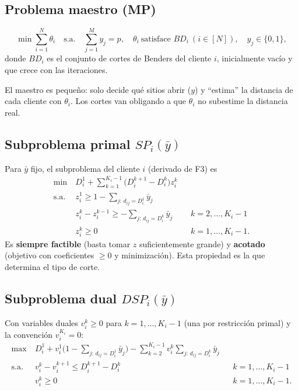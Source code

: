 \subsection{Problema maestro (MP)}
\begin{equation}
  \min \sum_{i=1}^N \theta_i
  \quad\text{s.a.}\quad
  \sum_{j=1}^M y_j=p,\quad
  \theta_i\ \text{satisface } BD_i\ (i\in[N]),\quad
  y_j\in\{0,1\},
  \label{eq:master}
\end{equation}
donde $BD_i$ es el conjunto de cortes de Benders del cliente $i$, inicialmente vacío y que crece
con las iteraciones.

\begin{intuicion}
El maestro es pequeño: solo decide qué sitios abrir ($y$) y ``estima'' la distancia de cada
cliente con $\theta_i$. Los cortes van obligando a que $\theta_i$ no subestime la distancia real.
\end{intuicion}

\subsection{Subproblema primal \texorpdfstring{$SP_i(\bar y)$}{SPi}}
Para $\bar y$ fijo, el subproblema del cliente $i$ (derivado de F3) es
\begin{align}
  \min\ & D^1_i + \sum_{k=1}^{K_i-1}\big(D^{k+1}_i-D^k_i\big)z^k_i \nonumber\\
  \text{s.a.}\ & z^1_i \ge 1-\!\!\sum_{j:\,d_{ij}=D^1_i}\!\!\bar y_j \label{eq:sp1}\\
  & z^k_i - z^{k-1}_i \ge -\!\!\sum_{j:\,d_{ij}=D^k_i}\!\!\bar y_j && k=2,\dots,K_i-1 \label{eq:spk}\\
  & z^k_i\ge 0 && k=1,\dots,K_i-1. \nonumber
\end{align}
Es \textbf{siempre factible} (basta tomar $z$ suficientemente grande) y \textbf{acotado} (objetivo
con coeficientes $\ge 0$ y minimización). Esta propiedad es la que determina el tipo de corte.

\subsection{Subproblema dual \texorpdfstring{$DSP_i(\bar y)$}{DSPi}}
Con variables duales $v^k_i\ge0$ para $k=1,\dots,K_i-1$ (una por restricción primal) y la
convención $v_i^{K_i}=0$:
\begin{align}
  \max\ & D^1_i + v^1_i\Big(1-\!\!\sum_{j:\,d_{ij}=D^1_i}\!\!\bar y_j\Big) - \sum_{k=2}^{K_i-1} v^k_i\!\!\sum_{j:\,d_{ij}=D^k_i}\!\!\bar y_j \nonumber\\
  \text{s.a.}\ & v^k_i - v^{k+1}_i \le D^{k+1}_i-D^k_i && k=1,\dots,K_i-1 \label{eq:dspcon}\\
  & v^k_i\ge 0 && k=1,\dots,K_i-1. \nonumber
\end{align}

